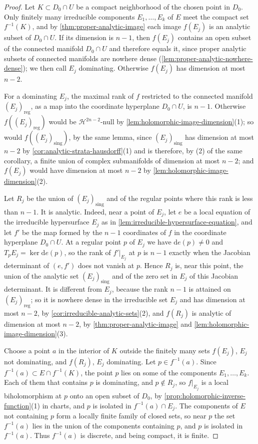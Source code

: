 \begin{proof}
Let $K\subset D_0\cap U$ be a compact neighborhood of the chosen point in $D_0$. Only finitely many irreducible components $E_1,\ldots,E_k$ of $E$ meet the compact set $f^{-1}(K)$, and by \cref{thm:proper-analytic-image} each image $f(E_j)$ is an analytic subset of $D_0\cap U$. If its dimension is $n-1$, then $f(E_j)$ contains an open subset of the connected manifold $D_0\cap U$ and therefore equals it, since proper analytic subsets of connected manifolds are nowhere dense (\cref{lem:proper-analytic-nowhere-dense}); we then call $E_j$ dominating. Otherwise $f(E_j)$ has dimension at most $n-2$.

For a dominating $E_j$, the maximal rank of $f$ restricted to the connected manifold $(E_j)_{\mathrm{reg}}$, as a map into the coordinate hyperplane $D_0\cap U$, is $n-1$. Otherwise $f((E_j)_{\mathrm{reg}})$ would be $\mathcal H^{2n-2}$-null by \cref{lem:holomorphic-image-dimension}(1); so would $f((E_j)_{\mathrm{sing}})$, by the same lemma, since $(E_j)_{\mathrm{sing}}$ has dimension at most $n-2$ by \cref{cor:analytic-strata-hausdorff}(1) and is therefore, by (2) of the same corollary, a finite union of complex submanifolds of dimension at most $n-2$; and $f(E_j)$ would have dimension at most $n-2$ by \cref{lem:holomorphic-image-dimension}(2).

Let $R_j$ be the union of $(E_j)_{\mathrm{sing}}$ and of the regular points where this rank is less than $n-1$. It is analytic. Indeed, near a point of $E_j$, let $e$ be a local equation of the irreducible hypersurface $E_j$ as in \cref{lem:irreducible-hypersurface-equation}, and let $f'$ be the map formed by the $n-1$ coordinates of $f$ in the coordinate hyperplane $D_0\cap U$. At a regular point $p$ of $E_j$ we have $\mathrm de(p)\neq0$ and $T_pE_j=\ker\mathrm de(p)$, so the rank of $f'|_{E_j}$ at $p$ is $n-1$ exactly when the Jacobian determinant of $(e,f')$ does not vanish at $p$. Hence $R_j$ is, near this point, the union of the analytic set $(E_j)_{\mathrm{sing}}$ and of the zero set in $E_j$ of this Jacobian determinant. It is different from $E_j$, because the rank $n-1$ is attained on $(E_j)_{\mathrm{reg}}$; so it is nowhere dense in the irreducible set $E_j$ and has dimension at most $n-2$, by \cref{cor:irreducible-analytic-sets}(2), and $f(R_j)$ is analytic of dimension at most $n-2$, by \cref{thm:proper-analytic-image} and \cref{lem:holomorphic-image-dimension}(3).

Choose a point $a$ in the interior of $K$ outside the finitely many sets $f(E_j)$, $E_j$ not dominating, and $f(R_j)$, $E_j$ dominating. Let $p\in f^{-1}(a)$. Since $f^{-1}(a)\subset E\cap f^{-1}(K)$, the point $p$ lies on some of the components $E_1,\ldots,E_k$. Each of them that contains $p$ is dominating, and $p\notin R_j$, so $f|_{E_j}$ is a local biholomorphism at $p$ onto an open subset of $D_0$, by \cref{prop:holomorphic-inverse-function}(1) in charts, and $p$ is isolated in $f^{-1}(a)\cap E_j$. The components of $E$ not containing $p$ form a locally finite family of closed sets, so near $p$ the set $f^{-1}(a)$ lies in the union of the components containing $p$, and $p$ is isolated in $f^{-1}(a)$. Thus $f^{-1}(a)$ is discrete, and being compact, it is finite.


\end{proof}
